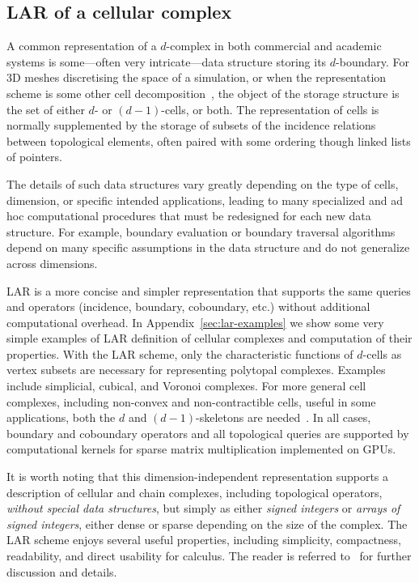 \subsection{LAR of a cellular complex}\label{representation}

{A} common representation of a $d$-complex in both commercial and academic systems is some---often very intricate---data structure  storing its $d$-boundary. For 3D meshes discretising the space of a simulation, or {when the representation scheme is some other cell decomposition}~\cite{Requicha:1980:RRS:356827.356833}, the object of the storage structure is the set of either $d$- or $(d-1)$-cells, or both. 
The representation of cells is normally supplemented by the storage of subsets of the incidence relations between topological elements, often paired with some ordering though linked lists of pointers.  

{The details of such data structures vary greatly depending on the type  of cells, dimension, or specific intended applications,  leading to many specialized and ad hoc computational procedures that must be redesigned for each new data structure.    For example,  boundary evaluation or boundary traversal algorithms depend on many specific assumptions in the data structure and do not generalize across dimensions.}

LAR is a more concise and simpler representation that supports the same queries and operators (incidence, boundary, coboundary, etc.)  without additional computational overhead.
{In Appendix~\ref{sec:lar-examples} we show some very simple examples of LAR definition of cellular complexes and computation of their properties. }
With the LAR scheme, only the characteristic functions of $d$-cells as vertex subsets are  necessary for representing polytopal complexes. Examples include simplicial, cubical, and Voronoi complexes. 
For more general cell complexes, including non-convex and non-contractible cells, useful in some applications, both the $d$ and $(d-1)$-skeletons are needed~\cite{Dicarlo:2014:TNL:2543138.2543294}. 
In all cases, boundary and coboundary operators and all topological queries are supported by computational kernels for sparse matrix multiplication implemented on GPUs.

It is worth noting that this {dimension-independent} representation supports a description of cellular and chain complexes, including topological operators, \emph{without special data structures}, but simply as either \emph{signed integers} or \emph{arrays of signed integers}, either dense or sparse depending on the size of the complex. 
The LAR scheme enjoys several useful properties, including simplicity, compactness, readability, and direct usability for calculus. The reader is referred to~\cite{Dicarlo:2014:TNL:2543138.2543294} for further discussion and details. 

